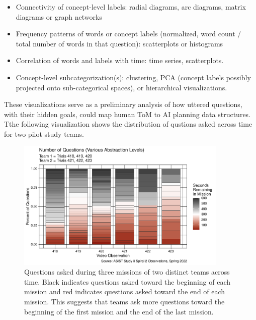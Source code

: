 \begin{itemize}

    \item Connectivity of concept-level labels: radial diagrams, arc diagrams,
        matrix diagrams or graph networks

    \item Frequency patterns of words or concept labels (normalized, word count
        / total number of words in that question): scatterplots or histograms

    \item Correlation of words and labels with time: time series, scatterplots. 

    \item Concept-level subcategorization(s): clustering, PCA (concept labels
        possibly projected onto sub-categorical spaces), or hierarchical
        visualizations.

\end{itemize}


These visualizations serve as a preliminary analysis of how uttered
questions, with their hidden goals, could map human ToM to AI planning data
structures. Tthe following visualization shows the distribution of
qustions asked across time for two pilot study teams. 


\begin{figure}[h]
    \centering
    \includegraphics[width=0.9\textwidth]{../images/prelim_percent_questions.pdf}
    \caption{Questions asked during three missions of two distinct teams across
    time. Black indicates questions asked toward the beginning of each mission
  and red indicates questions asked toward the end of each mission. This 
suggests that teams ask more questions toward the beginning of the
first mission and the end of the last mission.}
\end{figure}


